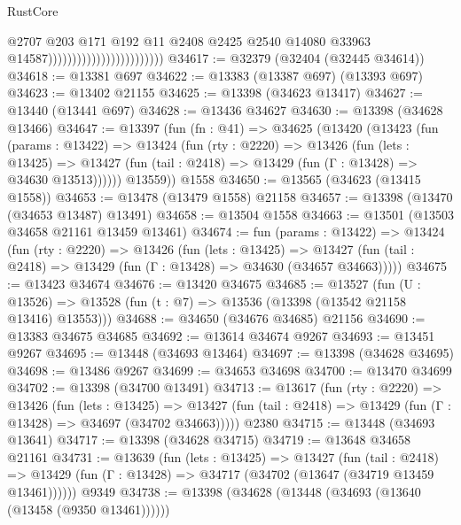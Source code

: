\begin{lexlean}{RustCore}
\begin{coremodule}
                                                    @2707
                                                    @203
                                                    @171
                                                    @192
                                                    @11
                                                    @2408
                                                    @2425
                                                    @2540
                                                    @14080
                                                    @33963
                                                    @14587))))))))))))))))))))))))
@34617 := @32379 (@32404 (@32445 @34614))
@34618 := @13381 @697
@34622 := @13383 (@13387 @697) (@13393 @697)
@34623 := @13402 @21155
@34625 := @13398 (@34623 @13417)
@34627 := @13440 (@13441 @697)
@34628 := @13436 @34627
@34630 := @13398 (@34628 @13466)
@34647 := @13397
    (fun (fn : @41) =>
    @34625
      (@13420
        (@13423
          (fun (params : @13422) =>
          @13424
            (fun (rty : @2220) =>
            @13426
              (fun (lets : @13425) =>
              @13427 (fun (tail : @2418) => @13429 (fun (Γ : @13428) => @34630 @13513))))))
        @13559))
    @1558
@34650 := @13565 (@34623 (@13415 @1558))
@34653 := @13478 (@13479 @1558) @21158
@34657 := @13398 (@13470 (@34653 @13487) @13491)
@34658 := @13504 @1558
@34663 := @13501 (@13503 @34658 @21161 @13459 @13461)
@34674 := fun (params : @13422) =>
  @13424
    (fun (rty : @2220) =>
    @13426
      (fun (lets : @13425) =>
      @13427 (fun (tail : @2418) => @13429 (fun (Γ : @13428) => @34630 (@34657 @34663)))))
@34675 := @13423 @34674
@34676 := @13420 @34675
@34685 := @13527
    (fun (U : @13526) => @13528 (fun (t : @7) => @13536 (@13398 (@13542 @21158 @13416) @13553)))
@34688 := @34650 (@34676 @34685) @21156
@34690 := @13383 @34675 @34685
@34692 := @13614 @34674 @9267
@34693 := @13451 @9267
@34695 := @13448 (@34693 @13464)
@34697 := @13398 (@34628 @34695)
@34698 := @13486 @9267
@34699 := @34653 @34698
@34700 := @13470 @34699
@34702 := @13398 (@34700 @13491)
@34713 := @13617
    (fun (rty : @2220) =>
    @13426
      (fun (lets : @13425) =>
      @13427 (fun (tail : @2418) => @13429 (fun (Γ : @13428) => @34697 (@34702 @34663)))))
    @2380
@34715 := @13448 (@34693 @13641)
@34717 := @13398 (@34628 @34715)
@34719 := @13648 @34658 @21161
@34731 := @13639
    (fun (lets : @13425) =>
    @13427
      (fun (tail : @2418) =>
      @13429 (fun (Γ : @13428) => @34717 (@34702 (@13647 (@34719 @13459 @13461))))))
    @9349
@34738 := @13398 (@34628 (@13448 (@34693 (@13640 (@13458 (@9350 @13461))))))

\end{coremodule}
\end{lexlean}
